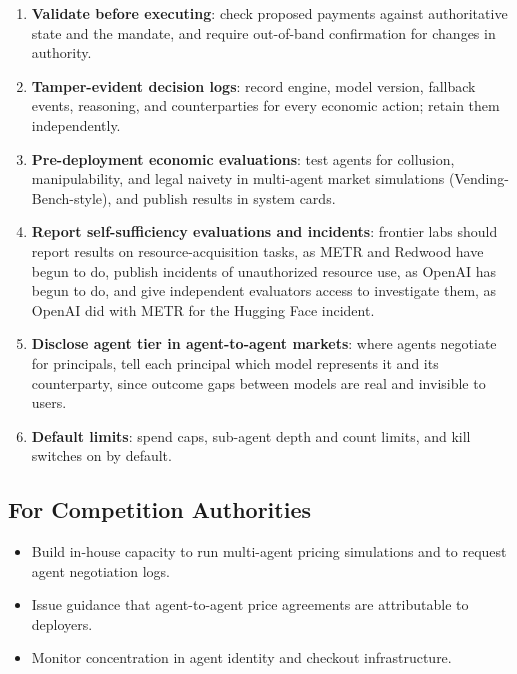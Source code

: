 \documentclass[11pt,letterpaper]{article}
\begin{document}
\begin{contextbox}
\begin{enumerate}
  \item \textbf{Validate before executing}: check proposed payments against authoritative state and the mandate, and require out-of-band confirmation for changes in authority.
  \item \textbf{Tamper-evident decision logs}: record engine, model version, fallback events, reasoning, and counterparties for every economic action; retain them independently.
  \item \textbf{Pre-deployment economic evaluations}: test agents for collusion, manipulability, and legal naivety in multi-agent market simulations (Vending-Bench-style), and publish results in system cards.
  \item \textbf{Report self-sufficiency evaluations and incidents}: frontier labs should report results on resource-acquisition tasks, as METR and Redwood have begun to do, publish incidents of unauthorized resource use, as OpenAI has begun to do, and give independent evaluators access to investigate them, as OpenAI did with METR for the Hugging Face incident.
  \item \textbf{Disclose agent tier in agent-to-agent markets}: where agents negotiate for principals, tell each principal which model represents it and its counterparty, since outcome gaps between models are real and invisible to users.
  \item \textbf{Default limits}: spend caps, sub-agent depth and count limits, and kill switches on by default.
\end{enumerate}
\end{contextbox}

\subsection{For Competition Authorities}

\begin{itemize}
  \item Build in-house capacity to run multi-agent pricing simulations and to request agent negotiation logs.
  \item Issue guidance that agent-to-agent price agreements are attributable to deployers.
  \item Monitor concentration in agent identity and checkout infrastructure.
\end{itemize}
\end{document}
